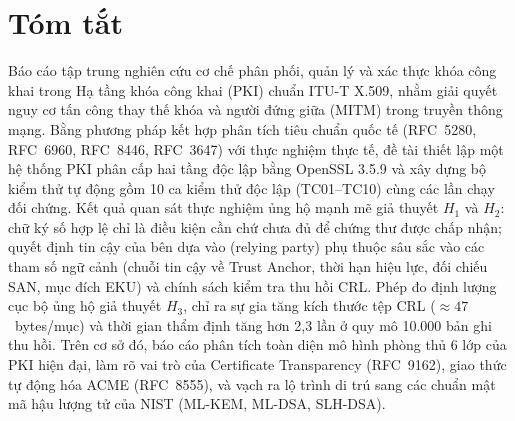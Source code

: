 \documentclass[12pt,a4paper]{report}
\begin{document}


\chapter*{Tóm tắt}
Báo cáo tập trung nghiên cứu cơ chế phân phối, quản lý và xác thực khóa công khai trong Hạ tầng khóa công khai (PKI) chuẩn ITU-T X.509, nhằm giải quyết nguy cơ tấn công thay thế khóa và người đứng giữa (MITM) trong truyền thông mạng. Bằng phương pháp kết hợp phân tích tiêu chuẩn quốc tế (RFC~5280, RFC~6960, RFC~8446, RFC~3647) với thực nghiệm thực tế, đề tài thiết lập một hệ thống PKI phân cấp hai tầng độc lập bằng OpenSSL 3.5.9 và xây dựng bộ kiểm thử tự động gồm 10 ca kiểm thử độc lập (TC01--TC10) cùng các lần chạy đối chứng. Kết quả quan sát thực nghiệm ủng hộ mạnh mẽ giả thuyết $H_1$ và $H_2$: chữ ký số hợp lệ chỉ là điều kiện cần chứ chưa đủ để chứng thư được chấp nhận; quyết định tin cậy của bên dựa vào (relying party) phụ thuộc sâu sắc vào các tham số ngữ cảnh (chuỗi tin cậy về Trust Anchor, thời hạn hiệu lực, đối chiếu SAN, mục đích EKU) và chính sách kiểm tra thu hồi CRL. Phép đo định lượng cục bộ ủng hộ giả thuyết $H_3$, chỉ ra sự gia tăng kích thước tệp CRL ($\approx 47$~bytes/mục) và thời gian thẩm định tăng hơn 2{,}3 lần ở quy mô 10.000 bản ghi thu hồi. Trên cơ sở đó, báo cáo phân tích toàn diện mô hình phòng thủ 6 lớp của PKI hiện đại, làm rõ vai trò của Certificate Transparency (RFC~9162), giao thức tự động hóa ACME (RFC~8555), và vạch ra lộ trình di trú sang các chuẩn mật mã hậu lượng tử của NIST (ML-KEM, ML-DSA, SLH-DSA).
\end{document}
